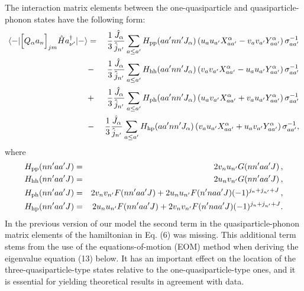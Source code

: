 The interaction matrix elements between the
one-quasiparticle and quasiparticle-phonon states have the following form:
\begin{eqnarray}
       \langle -\vert \Bigl\lbrack Q_{\alpha} a_n \Bigr\rbrack_{jm}
       {\hat{H}} a^{\dagger}_{\nu'} \vert -\rangle  &=& 
       \frac{1}{3} {\hat{J}_{\alpha}\over \hat{j}_{n'}}
       \sum_{a\le a'} H_{\rm pp}(aa'nn'J_{\alpha}) \left( u_a u_{a'}
       X^{\alpha}_{aa'} -v_a v_{a'} Y^{\alpha}_{aa'} \right) 
       \sigma_{aa'}^{-1} \nonumber \\
       &-& \frac{1}{3}{\hat{J}_{\alpha}\over{\hat{j}_{n'}}} \sum_{a\le a'}
       H_{\rm hh}(aa'nn'J_{\alpha})
       \left( v_a v_{a'} X^{\alpha}_{aa'} - u_a u_{a'} Y^{\alpha}_{aa'}
       \right) \sigma_{aa'}^{-1} \nonumber \\
       &+& \frac{1}{3}{\hat{J}_{\alpha}\over{\hat{j}_{n'}}} \sum_{a\le a'} 
       H_{\rm ph}(aa'nn'J_{\alpha}) \left( u_a v_{a'}
       X^{\alpha}_{aa'} + v_a u_{a'}
       Y^{\alpha}_{aa'} \right) \sigma_{aa'}^{-1} \\
       &-& \frac{1}{3}{\hat{J}_{\alpha}\over{\hat{j}_{n'}}}
       \sum_{a\le a'} H_{\rm hp}(aa'nn'J_{\alpha})
       \left( v_a u_{a'} X^{\alpha}_{aa'} + u_a v_{a'} Y^{\alpha}_{aa'}
       \right) \sigma_{aa'}^{-1}, \nonumber
\end{eqnarray}
where
\begin{eqnarray}
       H_{\rm pp} (nn'aa'J) &=& 2 v_n u_{n'} G(nn'aa'J)\,, \\
       H_{\rm hh}(nn'aa'J) &=& 2 u_n v_{n'} G(nn'aa'J)\,, \\
       H_{\rm ph}(nn'aa'J) &=& 2 v_n v_{n'} F(nn'aa'J) + 2 u_n u_{n'} 
       F(n'naa'J)(-1)^{j_n+j_{n'}+J}\,, \\
       H_{\rm hp}(nn'aa'J) &=& 2 u_n u_{n'} F(nn'aa'J) + 
       2 v_n v_{n'} F(n'naa'J)(-1)^{j_n+j_{n'}+J}.
\end{eqnarray}
In the previous version of our model \cite{TOI95} the second term in the
quasiparticle-phonon matrix elements of the hamiltonian in Eq. (6) was missing.
This additional term stems from the use of the equations-of-motion (EOM)
method \cite{ROW68} when deriving the eigenvalue equation (13) below.
It has an important effect on the location of the
three-quasiparticle-type states relative to the one-quasiparticle-type ones,
and it is essential for yielding theoretical results in agreement with data.

